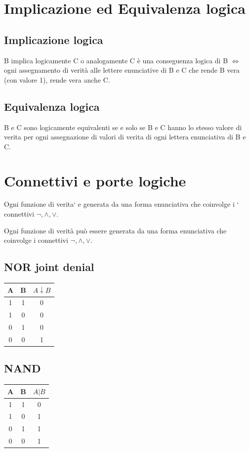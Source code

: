 \documentclass{article}
\begin{document}
\section{Implicazione ed Equivalenza logica}
\subsection{Implicazione logica}
B implica logicamente C o analogamente C è una conseguenza logica di B $\iff$ ogni assegnamento di verità alle lettere enunciative di B e C che rende B vera (con valore 1), rende vera anche C.

\subsection{Equivalenza logica}
B e C sono logicamente equivalenti se e solo se B e C hanno lo stesso valore di verita per ogni assegnazione di valori di verita di ogni lettera enunciativa di B e C.

\section{Connettivi e porte logiche}
Ogni funzione di verita` e generata da una forma enunciativa che coinvolge i `
connettivi $\neg, \land, \lor$.

Ogni funzione di verità può essere generata da una forma enunciativa che coinvolge i connettivi $\neg, \land, \lor$.

\subsection*{NOR joint denial}
\begin{center}
    \begin{tabular}{|c|c|c|}
        \hline
        A & B & $A \downarrow B$ \\
        \hline
        1 & 1 & 0 \\
        1 & 0 & 0 \\
        0 & 1 & 0 \\
        0 & 0 & 1 \\
        \hline
    \end{tabular}
\end{center}

\subsection*{NAND}
\begin{center}
    \begin{tabular}{|c|c|c|}
        \hline
        A & B & $A | B$ \\
        \hline
        1 & 1 & 0 \\
        1 & 0 & 1 \\
        0 & 1 & 1 \\
        0 & 0 & 1 \\
        \hline
    \end{tabular}
\end{center}
\end{document}
